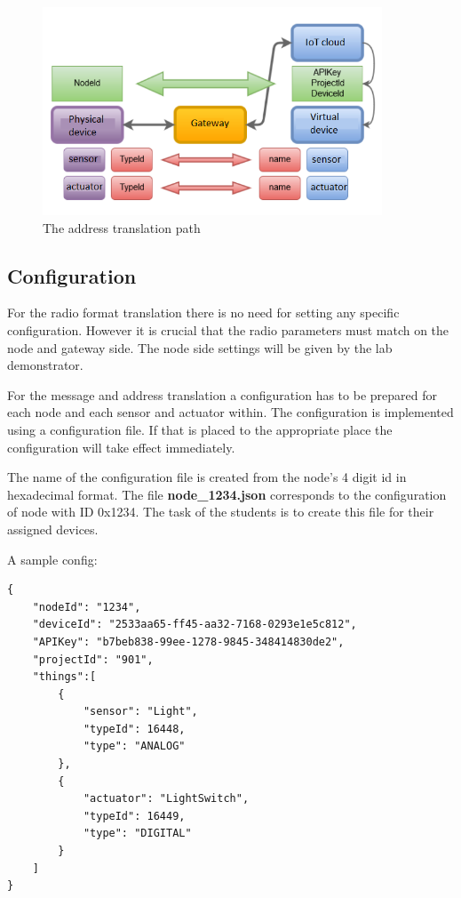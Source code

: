 \documentclass[a4paper]{article}
\begin{document}
\begin{figure}[H]
    \centering
    \includegraphics[width=0.9\textwidth]{figures/gateway-addresstranslation.png}
    \caption{The address translation path}
    \label{fig:gateway-addrtransl}
\end{figure}

\subsection{Configuration}

For the radio format translation there is no need for setting any specific configuration.
However it is crucial that the radio parameters must match on the node and gateway side.
The node side settings will be given by the lab demonstrator.

For the message and address translation a configuration has to be prepared for each node
and each sensor and actuator within. The configuration is implemented using a configuration
file. If that is placed to the appropriate place the configuration will take effect immediately.

The name of the configuration file is created from the node's 4 digit id in hexadecimal format.
The file \textbf{node\_1234.json} corresponds to the configuration of node with ID 0x1234. The
task of the students is to create this file for their assigned devices.

A sample config:
\begin{verbatim}
{
    "nodeId": "1234",
    "deviceId": "2533aa65-ff45-aa32-7168-0293e1e5c812",
    "APIKey": "b7beb838-99ee-1278-9845-348414830de2",
    "projectId": "901",
    "things":[
        {
            "sensor": "Light",
            "typeId": 16448,
            "type": "ANALOG"
        },
        {
            "actuator": "LightSwitch",
            "typeId": 16449,
            "type": "DIGITAL"
        }
    ]
}
\end{verbatim}
\end{document}
